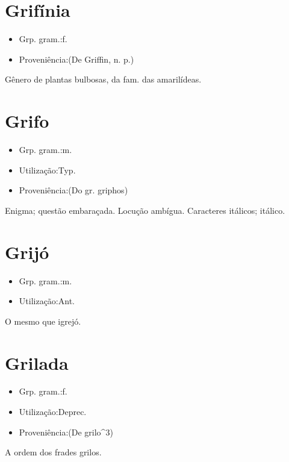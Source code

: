 \section{Grifínia}
\begin{itemize}
\item {Grp. gram.:f.}
\end{itemize}
\begin{itemize}
\item {Proveniência:(De \textunderscore Griffin\textunderscore , n. p.)}
\end{itemize}
Gênero de plantas bulbosas, da fam. das amarilídeas.
\section{Grifo}
\begin{itemize}
\item {Grp. gram.:m.}
\end{itemize}
\begin{itemize}
\item {Utilização:Typ.}
\end{itemize}
\begin{itemize}
\item {Proveniência:(Do gr. \textunderscore griphos\textunderscore )}
\end{itemize}
Enigma; questão embaraçada.
Locução ambígua.
Caracteres itálicos; itálico.
\section{Grijó}
\begin{itemize}
\item {Grp. gram.:m.}
\end{itemize}
\begin{itemize}
\item {Utilização:Ant.}
\end{itemize}
O mesmo que \textunderscore igrejó\textunderscore .
\section{Grilada}
\begin{itemize}
\item {Grp. gram.:f.}
\end{itemize}
\begin{itemize}
\item {Utilização:Deprec.}
\end{itemize}
\begin{itemize}
\item {Proveniência:(De \textunderscore grilo\textunderscore ^3)}
\end{itemize}
A ordem dos frades grilos.
